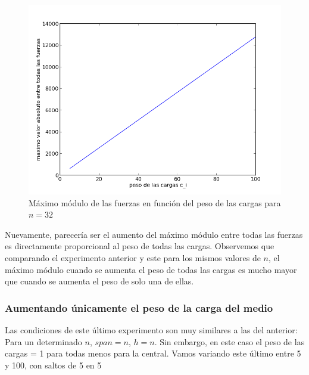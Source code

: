 \begin{figure}[!h]
	\begin{center}
		  \includegraphics[scale=0.4]{Imagenes/variable_cis/equal_cis/equal_cis_n_32}
		  \caption{Máximo módulo de las fuerzas en función del peso de las cargas para $n=32$}
		  \label{fig:contra1}
	\end{center}
\end{figure}

Nuevamente, parecería ser el aumento del máximo módulo entre todas las fuerzas es directamente proporcional al peso de
todas las cargas. Observemos que comparando el experimento anterior y este para los mismos valores de $n$, el 
máximo módulo cuando se aumenta el peso de todas las cargas es mucho mayor que cuando se aumenta el peso de solo una de
ellas.

\subsubsection{Aumentando únicamente el peso de la carga del medio}

Las condiciones de este último experimento son muy similares a las del anterior: Para un determinado $n$,
$span=n$, $h=n$. Sin embargo, en este caso el peso de las cargas = 1 para todas menos para la central.
Vamos variando este último entre 5 y 100, con saltos de 5 en 5

